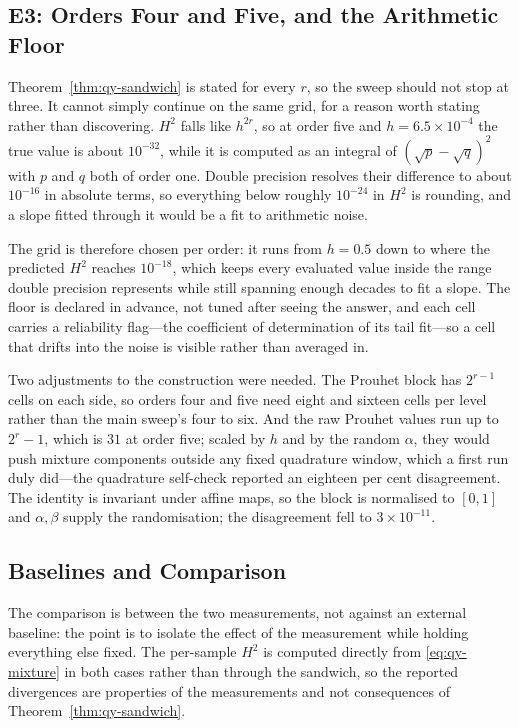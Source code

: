 \documentclass[conference]{IEEEtran}
\theoremstyle{definition}
\begin{document}
\subsection{E3: Orders Four and Five, and the Arithmetic Floor}
\label{sec:qy-e3}

Theorem~\ref{thm:qy-sandwich} is stated for every $r$, so the sweep should not stop at three. It
cannot simply continue on the same grid, for a reason worth stating rather than discovering.
$H^{2}$ falls like $h^{2r}$, so at order five and $h=6.5\times10^{-4}$ the true value is
about $10^{-32}$, while it is computed as an integral of
$(\sqrt{p}-\sqrt{q})^{2}$ with $p$ and $q$ both of order one. Double precision resolves their
difference to about $10^{-16}$ in absolute terms, so everything below roughly $10^{-24}$ in
$H^{2}$ is rounding, and a slope fitted through it would be a fit to arithmetic noise.

The grid is therefore chosen per order: it runs from $h=0.5$ down to where the predicted
$H^{2}$ reaches $10^{-18}$, which keeps every evaluated value inside the range double
precision represents while still spanning enough decades to fit a slope. The floor is
declared in advance, not tuned after seeing the answer, and each cell carries a reliability
flag---the coefficient of determination of its tail fit---so a cell that drifts into the
noise is visible rather than averaged in.

Two adjustments to the construction were needed. The Prouhet block has $2^{r-1}$ cells on
each side, so orders four and five need eight and sixteen cells per level rather than the
main sweep's four to six. And the raw Prouhet values run up to $2^{r}-1$, which is $31$ at
order five; scaled by $h$ and by the random $\alpha$, they would push mixture components
outside any fixed quadrature window, which a first run duly did---the quadrature self-check
reported an eighteen per cent disagreement. The identity is invariant under affine maps, so
the block is normalised to $[0,1]$ and $\alpha,\beta$ supply the randomisation; the
disagreement fell to $3\times10^{-11}$.

\subsection{Baselines and Comparison}

The comparison is between the two measurements, not against an external baseline: the point
is to isolate the effect of the measurement while holding everything else fixed. The
per-sample $H^{2}$ is computed directly from \eqref{eq:qy-mixture} in both cases rather than
through the sandwich, so the reported divergences are properties of the measurements and not
consequences of Theorem~\ref{thm:qy-sandwich}.
\end{document}
